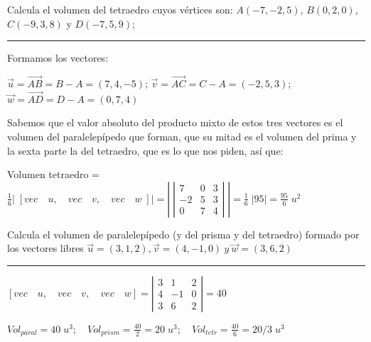 \vspace{3mm}
\begin{miejercicio}

Calcula el volumen del tetraedro cuyos vértices son: $A(-7,-2,5)$, $B(0,2,0)$, $C(-9,3,8)$  y $D(-7,5,9)$; 


\rule{200pt}{0.1pt}

Formamos los vectores:

$\vec u = \overrightarrow {AB}=B-A=(7,4,-5)$; 
$\vec v = \overrightarrow {AC}=C-A=(-2,5,3)$; 
$\vec w = \overrightarrow {AD}=D-A=(0,7,4)$

Sabemos que el valor absoluto del producto mixto de estos tres vectores es el volumen del paralelepípedo que forman, que su mitad es el volumen del prima y la sexta parte la del tetraedro, que es lo que nos piden, así que: 

Volumen tetraedro = $\frac 1 6 \left|\;  \left[ vec\quad u,\quad vec\quad v,\quad vec\quad w \; \right] \right|  =\left| \;  \left| \begin{matrix} 7 & 0 & 3 \\ -2 & 5 & 3 \\ 0 & 7 & 4 \end{matrix} \right|\;  \right| =\frac 1 6 \; |95|= \frac {95}{6} \; u^2$	
\end{miejercicio}

\vspace{3mm}
\begin{miejercicio}

	Calcula el volumen de paralelepípedo (y del prisma y del tetraedro) formado por los vectores libres $\vec u=(3,1,2), \vec v=(4,-1,0)\  y\  \vec w=(3,6,2)$

\rule{200pt}{0.1pt}
	
	$\left[ vec\quad u,\quad vec\quad v,\quad vec\quad w \right] =\left| \begin{matrix} 3 & 1 & 2 \\ 4 & -1 & 0 \\ 3 & 6 & 2 \end{matrix} \right| =40$
	
	$Vol_{paral}  = 40 \;  u^3; \quad  Vol_{prism} = \frac {40}2 =20\; u^3; \quad Vol_{tetr} = \frac {40}6 = 20/3 \; u^3$
\end{miejercicio}	


